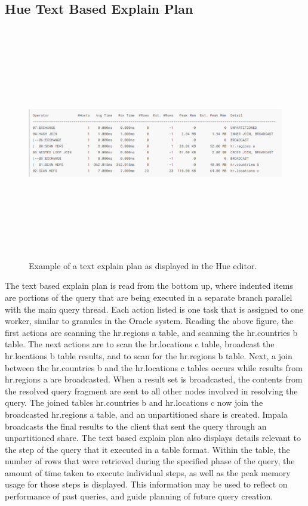 \documentclass[onecolumn, draftclsnofoot,10pt, compsoc]{IEEEtran}
\begin{document}
\subsection{Hue Text Based Explain Plan}
\begin{figure}[ht]
    \begin{center}
    \includegraphics[width=6in, height=4in, keepaspectratio]{NickTextExplainPlan.eps}
    \caption{Example of a text explain plan as displayed in the Hue editor.}
    \end{center}
\end{figure}
The text based explain plan is read from the bottom up, where indented items are portions of the query that are being executed in a separate branch parallel with the main query thread. Each action listed is one task that is assigned to one worker, similar to granules in the Oracle system. Reading the above figure, the first actions are scanning the hr.regions a table, and scanning the hr.countries b table. The next actions are to scan the hr.locations c table, broadcast the hr.locations b table results, and to scan for the hr.regions b table. Next, a join between the hr.countries b and the hr.locations c tables occurs while results from hr.regions a are broadcasted. When a result set is broadcasted, the contents from the resolved query fragment are sent to all other nodes involved in resolving the query. The joined tables hr.countries b and hr.locations c now join the broadcasted hr.regions a table, and an unpartitioned share is created. Impala broadcasts the final results to the client that sent the query through an unpartitioned share.
The text based explain plan also displays details relevant to the step of the query that it executed in a table format. Within the table, the number of rows that were retrieved during the specified phase of the query, the amount of time taken to execute individual steps, as well as the peak memory usage for those steps is displayed. This information may be used to reflect on performance of past queries, and guide planning of future query creation.
\pagebreak
\end{document}
